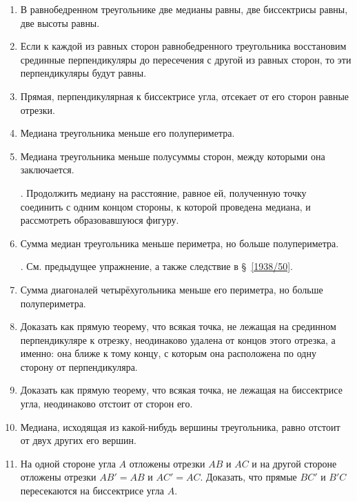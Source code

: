 \documentclass[twoside]{book}
\begin{document}
\begin{enumerate}

 \item
В равнобедренном треугольнике две медианы равны, две биссектрисы равны, две высоты равны.

 \item
Если к каждой из равных сторон равнобедренного треугольника восстановим срединные перпендикуляры до пересечения с другой из равных сторон, то эти перпендикуляры будут равны. 

 \item
Прямая, перпендикулярная к биссектрисе угла, отсекает от его сторон равные отрезки.

 \item
Медиана треугольника меньше его полупериметра.

 \item
Медиана треугольника меньше полусуммы сторон, между которыми она заключается.

\smallskip
{}.
Продолжить медиану на расстояние, равное ей, полученную точку соединить с одним концом стороны, к которой проведена медиана, и рассмотреть образовавшуюся фигуру.

 \item
Сумма медиан треугольника меньше периметра, но больше полупериметра.

\smallskip
{}.
См. предыдущее упражнение, а также следствие в §~\ref{1938/50}.

 \item
Сумма диагоналей четырёхугольника меньше его периметра, но больше полупериметра.

 \item
Доказать как прямую теорему, что всякая точка, не лежащая на срединном перпендикуляре к отрезку, неодинаково удалена от концов этого отрезка, а именно: 
она ближе к тому концу, с которым она расположена по одну сторону от перпендикуляра.

 \item
Доказать как прямую теорему, что всякая точка, не лежащая на биссектрисе угла, неодинаково отстоит от сторон его.

 \item
Медиана, исходящая из какой-нибудь вершины треугольника, равно отстоит от двух других его вершин.

 \item
На одной стороне угла $A$ отложены отрезки $AB$ и $AC$ и на другой стороне отложены отрезки $AB'=AB$ и $AC' = AC$.
Доказать, что прямые $BC'$ и $B'C$ пересекаются на биссектрисе угла $A$.


\end{enumerate}
\end{document}
